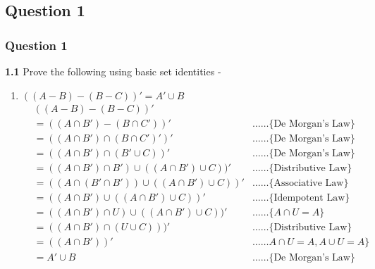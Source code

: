 \documentclass[xcolor=svgnames]{beamer}
\begin{document}
\subsection{Question 1}
\begin{frame}
\frametitle{Question 1}
\textbf{1.1} Prove the following using basic set identities - 
\begin{enumerate}
    \item $((A - B) - (B - C))' = A' \cup B$ 
    \begin{align*}
        & ((A - B) - (B - C))' &  \\
        &= ((A \cap B') - (B \cap C'))' & \ldots \ldots \{\text{De Morgan's Law}\}\\
        &= ((A \cap B') \cap (B \cap C')')' & \ldots \ldots \{\text{De Morgan's Law}\} \\
        &= ((A \cap B') \cap (B' \cup C))' & \ldots \ldots \{\text{De Morgan's Law}\}\\
        &= ((A \cap B') \cap B') \cup ((A \cap B') \cup C))' & \ldots \ldots \{\text{Distributive Law}\} \\ 
        &= ((A \cap (B' \cap B')) \cup ((A \cap B') \cup C))' & \ldots \ldots \{\text{Associative Law}\}\\
        &= ((A \cap B') \cup ((A \cap B') \cup C))' & \ldots \ldots \{\text{Idempotent Law}\} \\
        &= ((A \cap B') \cap U) \cup ((A \cap B') \cup C))' & \ldots \ldots \{A \cap U = A\}\\
        &= ((A \cap B') \cap (U \cup C)))' & \ldots \ldots \{\text{Distributive Law}\}\\
        &= ((A \cap B'))' & \ldots \ldots A \cap U = A, A \cup U = A\} \\
        &= A' \cup B & \ldots \ldots \{\text{De Morgan's Law}\}\\
    \end{align*}
\end{enumerate}
\end{frame}
\end{document}
